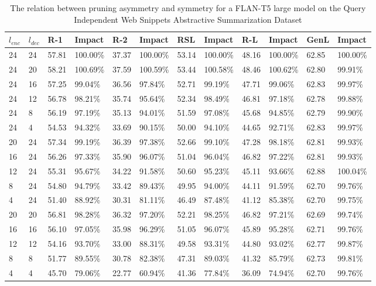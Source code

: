 \begin{table*}[!ht]
    \centering
    \caption{The relation between pruning asymmetry and symmetry for a FLAN-T5 large model on the Query Independent Web Snippets Abstractive Summarization Dataset}
    \small\begin{tabular}{|l|l|l|l|l|l|l|l|l|l|l|l|}
    \hline
        $l_{enc}$ & $l_{dec}$ & R-1 & Impact & R-2 & Impact & RSL & Impact & R-L & Impact & GenL & Impact \\ \hline
        24 & 24 & 57.81 & 100.00\% & 37.37 & 100.00\% & 53.14 & 100.00\% & 48.16 & 100.00\% & 62.85 & 100.00\% \\ \hline
        24 & 20 & 58.21 & 100.69\% & 37.59 & 100.59\% & 53.44 & 100.58\% & 48.46 & 100.62\% & 62.80 & 99.91\% \\ \hline
        24 & 16 & 57.25 & 99.04\% & 36.56 & 97.84\% & 52.71 & 99.19\% & 47.71 & 99.06\% & 62.83 & 99.97\% \\ \hline
        24 & 12 & 56.78 & 98.21\% & 35.74 & 95.64\% & 52.34 & 98.49\% & 46.81 & 97.18\% & 62.78 & 99.88\% \\ \hline
        24 & 8 & 56.19 & 97.19\% & 35.13 & 94.01\% & 51.59 & 97.08\% & 45.68 & 94.85\% & 62.79 & 99.90\% \\ \hline
        24 & 4 & 54.53 & 94.32\% & 33.69 & 90.15\% & 50.00 & 94.10\% & 44.65 & 92.71\% & 62.83 & 99.97\% \\ \hline
        20 & 24 & 57.34 & 99.19\% & 36.39 & 97.38\% & 52.66 & 99.10\% & 47.28 & 98.18\% & 62.81 & 99.93\% \\ \hline
        16 & 24 & 56.26 & 97.33\% & 35.90 & 96.07\% & 51.04 & 96.04\% & 46.82 & 97.22\% & 62.81 & 99.93\% \\ \hline
        12 & 24 & 55.31 & 95.67\% & 34.22 & 91.58\% & 50.60 & 95.23\% & 45.11 & 93.66\% & 62.88 & 100.04\% \\ \hline
        8 & 24 & 54.80 & 94.79\% & 33.42 & 89.43\% & 49.95 & 94.00\% & 44.11 & 91.59\% & 62.70 & 99.76\% \\ \hline
        4 & 24 & 51.40 & 88.92\% & 30.31 & 81.11\% & 46.49 & 87.48\% & 41.12 & 85.38\% & 62.70 & 99.75\% \\ \hline
        20 & 20 & 56.81 & 98.28\% & 36.32 & 97.20\% & 52.21 & 98.25\% & 46.82 & 97.21\% & 62.69 & 99.74\% \\ \hline
        16 & 16 & 56.10 & 97.05\% & 35.98 & 96.29\% & 51.05 & 96.07\% & 45.89 & 95.28\% & 62.71 & 99.76\% \\ \hline
        12 & 12 & 54.16 & 93.70\% & 33.00 & 88.31\% & 49.58 & 93.31\% & 44.80 & 93.02\% & 62.77 & 99.87\% \\ \hline
        8 & 8 & 51.77 & 89.55\% & 30.78 & 82.38\% & 47.31 & 89.03\% & 41.32 & 85.79\% & 62.73 & 99.81\% \\ \hline
        4 & 4 & 45.70 & 79.06\% & 22.77 & 60.94\% & 41.36 & 77.84\% & 36.09 & 74.94\% & 62.70 & 99.76\% \\ \hline
    \end{tabular}
    \label{tab:asym-large-qiws}
\end{table*}
